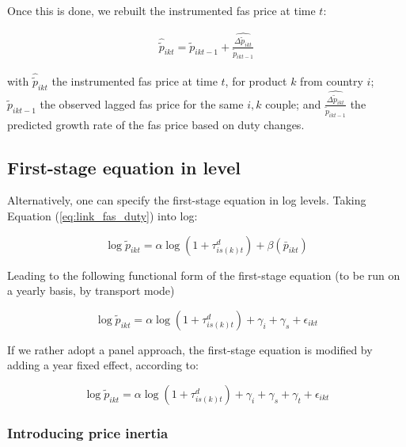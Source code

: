 \documentclass[11pt,twoside, authoryear]{elsarticle}
\begin{document}
Once this is done, we rebuilt the instrumented fas price at time $t$:

\begin{eqnarray*}
\widehat{\widetilde{p}}_{ikt} = \widetilde{p}_{ikt-1}+ \widehat{\frac{\Delta \widetilde{p}_{ikt}}{\widetilde{p}_{ikt-1}}}
\end{eqnarray*}

with $\widehat{\widetilde{p}}_{ikt}$ the instrumented fas price at time $t$, for product $k$ from country $i$; $\widetilde{p}_{ikt-1}$ the observed lagged fas price for the same $i,k$ couple; and $ \widehat{\frac{\Delta \widetilde{p}_{ikt}}{\widetilde{p}_{ikt-1}}}$ the predicted growth rate of the fas price based on duty changes.

\subsection{First-stage equation in level}

Alternatively, one can specify the first-stage equation in log levels. Taking Equation (\ref{eq:link_fas_duty}) into log:

$$\log \widetilde{p}_{ikt} =\alpha \log (1+\tau^d_{is(k)t}) + \beta \left(\bar{p}_{ikt}\right) $$

Leading to the following functional form of the first-stage equation (to be run on a yearly basis, by transport mode)

\begin{equation}
\log \widetilde{p}_{ikt} =\alpha \log (1+\tau^d_{is(k)t}) + \gamma_i +\gamma_s +\epsilon_{ikt}  \label{eq:FS_loglevel_cross_section}
\end{equation} 

If we rather adopt a panel approach, the first-stage equation is modified by adding a year fixed effect, according to:

\begin{equation}
\log \widetilde{p}_{ikt} =\alpha \log (1+\tau^d_{is(k)t}) + \gamma_i +\gamma_s +\gamma_t +\epsilon_{ikt}  \label{eq:FS_loglevel_panel}
\end{equation} 

\subsubsection{Introducing price inertia}
\end{document}
